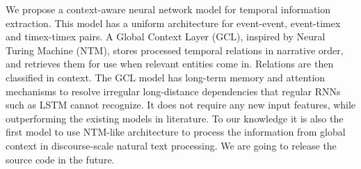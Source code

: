 We propose a context-aware neural network model for temporal information extraction. This model has a uniform architecture for event-event, event-timex and timex-timex pairs. A Global Context Layer (GCL), inspired by Neural Turing Machine (NTM), stores processed temporal relations in narrative order, and retrieves them for use when relevant entities come in. Relations are then classified in context. The GCL model has long-term memory and attention mechanisms to resolve irregular long-distance dependencies that regular RNNs such as LSTM cannot recognize. It does not require any new input features, while outperforming the existing models in literature. To our knowledge it is also the first model to use NTM-like architecture to process the information from global context in discourse-scale natural text processing. We are going to release the source code in the future.
